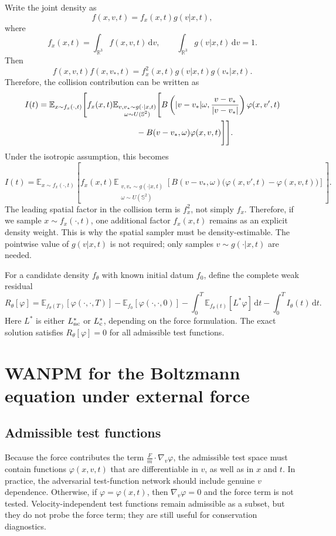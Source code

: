 \documentclass[11pt]{article}
\newcommand{\R}{\mathbb{R}}
\newcommand{\Sph}{\mathbb{S}^{2}}
\newcommand{\dd}{\,\mathrm{d}}
\newcommand{\E}{\mathbb{E}}
\newcommand{\ph}{\varphi}
\theoremstyle{plain}
\begin{document}
Write the joint density as
\begin{equation}
f(x,v,t)=f_x(x,t)g(v|x,t),
\label{eq:fx_split}
\end{equation}
where
\[
f_x(x,t)=\int_{\R^3}f(x,v,t)\dd v,
\qquad
\int_{\R^3}g(v|x,t)\dd v=1.
\]
Then
\[
f(x,v,t)f(x,v_*,t)=f_x^2(x,t)g(v|x,t)g(v_*|x,t).
\]
Therefore, the collision contribution can be written as
\begin{align}
I(t)
&=
\E_{x\sim f_x(\cdot,t)}
\Bigg[
f_x(x,t)
\E_{\substack{v,v_*\sim g(\cdot|x,t)\\ \omega\sim U(\Sph)}}
\Bigg[
B\left(|v-v_*|\omega,\frac{v-v_*}{|v-v_*|}\right)\ph(x,v',t)
\notag\\
&\hspace{4.2cm}
-
B(v-v_*,\omega)\ph(x,v,t)
\Bigg]
\Bigg].
\label{eq:I_split_general}
\end{align}
Under the isotropic assumption, this becomes
\begin{equation}
I(t)
=
\E_{x\sim f_x(\cdot,t)}
\left[
f_x(x,t)
\E_{\substack{v,v_*\sim g(\cdot|x,t)\\ \omega\sim U(\Sph)}}
\left[
B(v-v_*,\omega)\big(\ph(x,v',t)-\ph(x,v,t)\big)
\right]
\right].
\label{eq:I_split_iso}
\end{equation}
The leading spatial factor in the collision term is $f_x^2$, not simply $f_x$. Therefore, if we sample $x\sim f_x(\cdot,t)$, one additional factor $f_x(x,t)$ remains as an explicit density weight. This is why the spatial sampler must be density-estimable. The pointwise value of $g(v|x,t)$ is not required; only samples $v\sim g(\cdot|x,t)$ are needed.

For a candidate density $f_\theta$ with known initial datum $f_0$, define the complete weak residual
\begin{equation}
R_\theta[\ph]
=
\E_{f_\theta(T)}[\ph(\cdot,\cdot,T)]
-
\E_{f_0}[\ph(\cdot,\cdot,0)]
-
\int_0^T \E_{f_\theta(t)}[L^*\ph]\dd t
-
\int_0^T I_\theta(t)\dd t.
\label{eq:complete_residual}
\end{equation}
Here $L^*$ is either $L^*_{\rm nc}$ or $L^*_{\rm c}$, depending on the force formulation. The exact solution satisfies $R_\theta[\ph]=0$ for all admissible test functions.

\section{WANPM for the Boltzmann equation under external force}
\label{sec:wanpm-forced}
\subsection{Admissible test functions}
Because the force contributes the term $\frac{F}{m}\cdot\nabla_v\ph$, the admissible test space must contain functions $\ph(x,v,t)$ that are differentiable in $v$, as well as in $x$ and $t$. In practice, the adversarial test-function network should include genuine $v$ dependence. Otherwise, if $\ph=\ph(x,t)$, then $\nabla_v\ph=0$ and the force term is not tested. Velocity-independent test functions remain admissible as a subset, but they do not probe the force term; they are still useful for conservation diagnostics.
\end{document}
